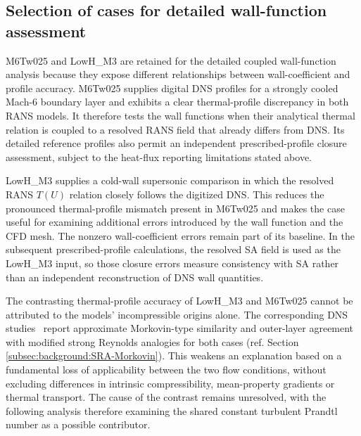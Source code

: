 \subsection{Selection of cases for detailed wall-function assessment}
\label{subsec:comparative:zpg:case-selection}

M6Tw025 and LowH\_M3 are retained for the detailed coupled wall-function analysis because they expose different relationships between wall-coefficient and profile accuracy. M6Tw025 supplies digital DNS profiles for a strongly cooled Mach-6 boundary layer and exhibits a clear thermal-profile discrepancy in both RANS models. It therefore tests the wall functions when their analytical thermal relation is coupled to a resolved RANS field that already differs from DNS. Its detailed reference profiles also permit an independent prescribed-profile closure assessment, subject to the heat-flux reporting limitations stated above.
\par\medskip

LowH\_M3 supplies a cold-wall supersonic comparison in which the resolved RANS \(T(U)\) relation closely follows the digitized DNS. This reduces the pronounced thermal-profile mismatch present in M6Tw025 and makes the case useful for examining additional errors introduced by the wall function and the CFD mesh. The nonzero wall-coefficient errors remain part of its baseline. In the subsequent prescribed-profile calculations, the resolved SA field is used as the LowH\_M3 input, so those closure errors measure consistency with SA rather than an independent reconstruction of DNS wall quantities.
\par\medskip

The contrasting thermal-profile accuracy of LowH\_M3 and M6Tw025 cannot be attributed to the models' incompressible origins alone. The corresponding DNS studies~\cite{zhang2018direct,duan2011direct_Part4} report approximate Morkovin-type similarity and outer-layer agreement with modified strong Reynolds analogies for both cases (ref. Section \ref{subsec:background:SRA-Morkovin}). This weakens an explanation based on a fundamental loss of applicability between the two flow conditions, without excluding differences in intrinsic compressibility, mean-property gradients or thermal transport. The cause of the contrast remains unresolved, with the following analysis therefore examining the shared constant turbulent Prandtl number as a possible contributor.
